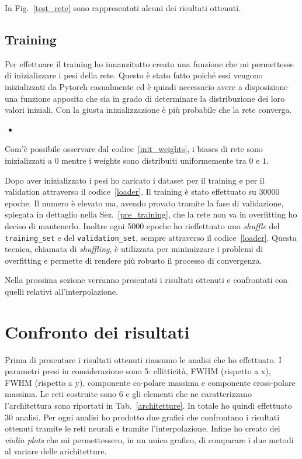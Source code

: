 \documentclass[12pt,a4paper,final]{book}
\newcommand{\insertcode}[2]{\begin{itemize}\item[]\end{itemize}} %
\begin{document}
In Fig.~\ref{test_rete} sono rappresentati alcuni dei risultati ottenuti.



\subsection{Training}\label{training}
Per effettuare il training ho innanzitutto creato una funzione che mi permettesse di inizializzare i pesi della rete. Questo è stato fatto poiché essi vengono inizializzati da Pytorch casualmente ed è quindi necessario avere a disposizione una funzione apposita che sia in grado di determinare la distribuzione dei loro valori iniziali. Con la giusta inizializzazione è più probabile che la rete converga.
\insertcode{../scripts/init_weights.py}{Inizializzazione di weights e biases}\label{init_weights}
Com'è possibile osservare dal codice~\ref{init_weights}, i biases di rete sono inizializzati a $0$ mentre i weights sono distribuiti uniformemente tra $0$ e $1$.


Dopo aver inizializzato i pesi ho caricato i dataset per il training e per il validation attraverso il codice~\ref{loader}.
Il training è stato effettuato su 30000 epoche. Il numero è elevato ma, avendo provato tramite la fase di validazione, spiegata in dettaglio nella Sez.~\ref{pre_training}, che la rete non va in overfitting ho deciso di mantenerlo. 
Inoltre ogni 5000 epoche ho rieffettuato uno \textit{shuffle} del \texttt{training\_set} e del \texttt{validation\_set}, sempre attraverso il codice~\ref{loader}. Questa tecnica, chiamata di \textit{shuffling}, è utilizzata per minimizzare i problemi di overfitting e permette di rendere più robusto il processo di convergenza.


Nella prossima sezione verranno presentati i risultati ottenuti e confrontati con quelli relativi all'interpolazione.


\section{Confronto dei risultati}\label{risultati}
Prima di presentare i risultati ottenuti riassumo le analisi che ho effettuato. I parametri presi in considerazione sono 5: ellitticità, FWHM (rispetto a x), FWHM (rispetto a y), componente co-polare massima e componente cross-polare massima. Le reti costruite sono 6 e gli elementi che ne caratterizzano l'architettura sono riportati in Tab.~\ref{architetture}. In totale ho quindi effettuato 30 analisi.
Per ogni analisi ho prodotto due grafici che confrontano i risultati ottenuti tramite le  reti neurali e tramite l'interpolazione. Infine ho creato dei \textit{violin plots} che mi permettessero, in un unico grafico, di comparare i due metodi al variare delle arichitetture.
\end{document}
